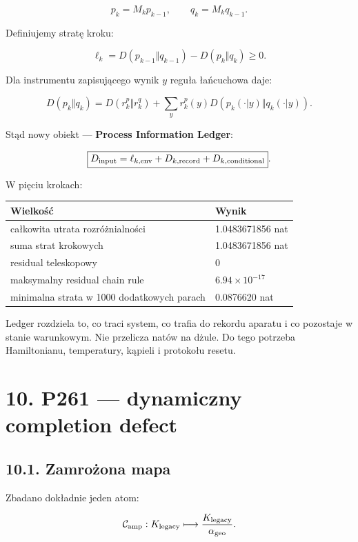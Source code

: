 \documentclass[11pt,a4paper,openany]{report}
\begin{document}
\[
p_k=M_kp_{k-1},\qquad q_k=M_kq_{k-1}.
\]

Definiujemy stratę kroku:

\[
\ell_k
=
D(p_{k-1}\Vert q_{k-1})
-D(p_k\Vert q_k)
\geq0.
\]

Dla instrumentu zapisującego wynik \(y\) reguła łańcuchowa daje:

\[
D(p_k\Vert q_k)
=
D(r_k^p\Vert r_k^q)
+
\sum_y r_k^p(y)
D(p_k(\cdot|y)\Vert q_k(\cdot|y)).
\]

Stąd nowy obiekt --- \textbf{Process Information Ledger}:

\[
\boxed{
D_{\rm input}
=
\ell_{k,\rm env}
+D_{k,\rm record}
+D_{k,\rm conditional}
}.
\]

W pięciu krokach:

\begin{center}
\begingroup\small
\setlength{\tabcolsep}{2.5pt}
\renewcommand{\arraystretch}{1.16}
\begin{longtable}{@{}p{}p{}@{}}
\toprule
\textbf{Wielkość} & \textbf{Wynik} \\
\midrule
\endhead
całkowita utrata rozró\.znialności & 1.0483671856 nat \\
suma strat krokowych & 1.0483671856 nat \\
residual teleskopowy & 0 \\
maksymalny residual chain rule & \(6.94\times10^{-17}\) \\
minimalna strata w 1000 dodatkowych parach & 0.0876620 nat \\
\bottomrule
\end{longtable}
\endgroup
\end{center}

Ledger rozdziela to, co traci system, co trafia do rekordu aparatu i co pozostaje w stanie warunkowym. Nie przelicza natów na d\.zule. Do tego potrzeba Hamiltonianu, temperatury, kąpieli i protokołu resetu.

\chapter{10. P261 --- dynamiczny completion defect}

\section{10.1. Zamro\.zona mapa}

Zbadano dokładnie jeden atom:

\[
\mathcal C_{\rm amp}:
K_{\rm legacy}
\longmapsto
\frac{K_{\rm legacy}}{\alpha_{\rm geo}}.
\]
\end{document}
